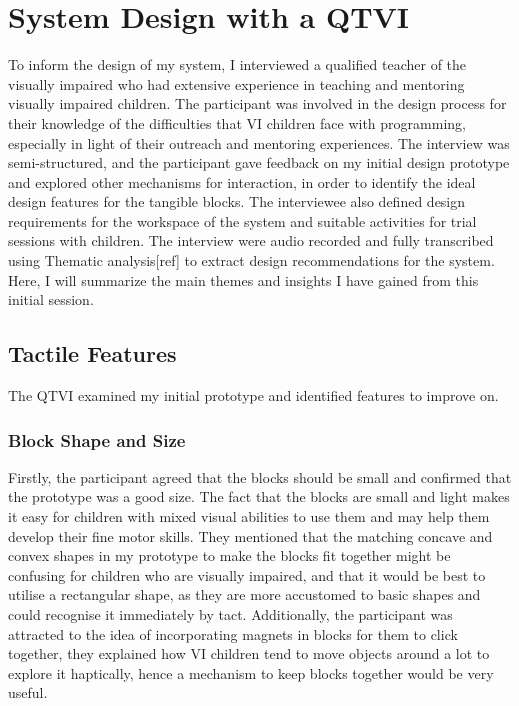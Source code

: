 \documentclass[oneside,%
                    author={Malak Hajji},
                    degree={BSc},
                    title={Designing An Accessible Computational Toolkit For Students},
                  subtitle={With Mixed Visual Abilities}]{dissertation}
\begin{document}
\section{System Design with a QTVI}
To inform the design of my system, I interviewed a qualified teacher of the visually impaired who had extensive experience in teaching and mentoring visually impaired children. The participant was involved in the design process for their knowledge of the difficulties that VI children face with programming, especially in light of their outreach and mentoring experiences. The interview was semi-structured, and the participant gave feedback on my initial design prototype and explored other mechanisms for interaction, in order to identify the ideal design features for the tangible blocks. The interviewee also defined design requirements for the workspace of the system and suitable activities for trial sessions with children. 
The interview were audio recorded and fully transcribed using Thematic analysis[ref] to extract design recommendations for the system. Here, I will summarize the main themes and insights I have gained from this initial session.

\subsection{Tactile Features}
The QTVI examined my initial prototype and identified features to improve on.
\subsubsection{Block Shape and Size}
Firstly, the participant agreed that the blocks should be small and confirmed that the prototype was a good size. The fact that the blocks are small and light makes it easy for  children with mixed visual abilities to use them and may help them develop their fine motor skills. They mentioned that the  matching concave and convex shapes in my prototype to make the blocks fit together might be confusing for children who are visually impaired, and that it would be best to utilise a rectangular shape, as they are more accustomed to basic shapes and could recognise it immediately by tact. Additionally, the participant was attracted to the idea of incorporating magnets in blocks for them to click together, they explained how VI children tend to move objects around a lot to explore it haptically, hence a mechanism to keep blocks together would be very useful.
\end{document}
